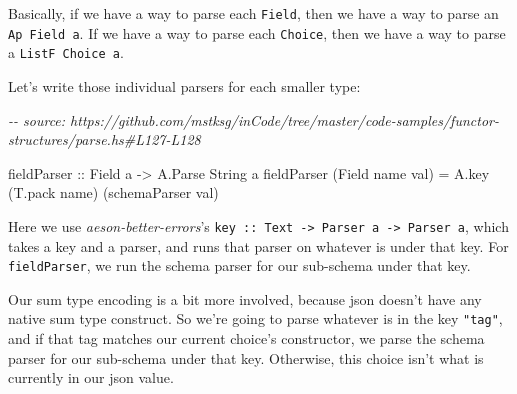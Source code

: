 \documentclass[]{article}
\newenvironment{Shaded}{}{}
\newcommand{\CommentTok}[1]{\textcolor[rgb]{0.38,0.63,0.69}{\textit{#1}}}
\newcommand{\DataTypeTok}[1]{\textcolor[rgb]{0.56,0.13,0.00}{#1}}
\newcommand{\KeywordTok}[1]{\textcolor[rgb]{0.00,0.44,0.13}{\textbf{#1}}}
\newcommand{\NormalTok}[1]{#1}
\newcommand{\OperatorTok}[1]{\textcolor[rgb]{0.40,0.40,0.40}{#1}}
\newcommand{\OtherTok}[1]{\textcolor[rgb]{0.00,0.44,0.13}{#1}}
\newcommand{\StringTok}[1]{\textcolor[rgb]{0.25,0.44,0.63}{#1}}
\begin{document}
Basically, if we have a way to parse each \texttt{Field}, then we have a way to
parse an \texttt{Ap\ Field\ a}. If we have a way to parse each \texttt{Choice},
then we have a way to parse a \texttt{ListF\ Choice\ a}.

Let's write those individual parsers for each smaller type:

\begin{Shaded}
\begin{Highlighting}[]
\CommentTok{{-}{-} source: https://github.com/mstksg/inCode/tree/master/code{-}samples/functor{-}structures/parse.hs\#L127{-}L128}

\OtherTok{fieldParser ::} \DataTypeTok{Field}\NormalTok{ a }\OtherTok{{-}>} \DataTypeTok{A.Parse} \DataTypeTok{String}\NormalTok{ a}
\NormalTok{fieldParser (}\DataTypeTok{Field}\NormalTok{ name val) }\OtherTok{=}\NormalTok{ A.key (T.pack name) (schemaParser val)}
\end{Highlighting}
\end{Shaded}

Here we use \emph{aeson-better-errors}'s
\texttt{key\ ::\ Text\ -\textgreater{}\ Parser\ a\ -\textgreater{}\ Parser\ a},
which takes a key and a parser, and runs that parser on whatever is under that
key. For \texttt{fieldParser}, we run the schema parser for our sub-schema under
that key.

\begin{Shaded}
\end{Shaded}

Our sum type encoding is a bit more involved, because json doesn't have any
native sum type construct. So we're going to parse whatever is in the key
\texttt{"tag"}, and if that tag matches our current choice's constructor, we
parse the schema parser for our sub-schema under that key. Otherwise, this
choice isn't what is currently in our json value.
\end{document}
